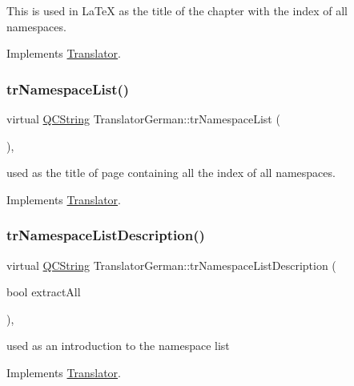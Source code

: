 This is used in La\+TeX as the title of the chapter with the index of all namespaces. 

Implements \mbox{\hyperlink{class_translator}{Translator}}.

\mbox{\label{class_translator_german_a4ffd2dcaf31d2dadb2fdc7913bffb8ed}} 
\subsubsection{\texorpdfstring{trNamespaceList()}{trNamespaceList()}}
{\footnotesize\ttfamily virtual \mbox{\hyperlink{class_q_c_string}{Q\+C\+String}} Translator\+German\+::tr\+Namespace\+List (\begin{DoxyParamCaption}{ }\end{DoxyParamCaption})\hspace{0.3cm}{\ttfamily [inline]}, {\ttfamily [virtual]}}

used as the title of page containing all the index of all namespaces. 

Implements \mbox{\hyperlink{class_translator}{Translator}}.

\mbox{\label{class_translator_german_aa6c324eac86757a3b3d09252963e0467}} 
\subsubsection{\texorpdfstring{trNamespaceListDescription()}{trNamespaceListDescription()}}
{\footnotesize\ttfamily virtual \mbox{\hyperlink{class_q_c_string}{Q\+C\+String}} Translator\+German\+::tr\+Namespace\+List\+Description (\begin{DoxyParamCaption}\item[{bool}]{extract\+All }\end{DoxyParamCaption})\hspace{0.3cm}{\ttfamily [inline]}, {\ttfamily [virtual]}}

used as an introduction to the namespace list 

Implements \mbox{\hyperlink{class_translator}{Translator}}.

